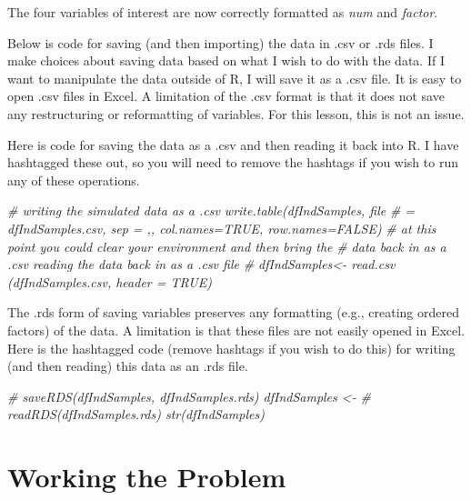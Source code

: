 \documentclass[
  11pt,
]{book}
\newenvironment{Shaded}{\begin{snugshade}}{\end{snugshade}}
\newcommand{\CommentTok}[1]{\textcolor[rgb]{0.56,0.35,0.01}{\textit{#1}}}
\begin{document}
The four variables of interest are now correctly formatted as \emph{num} and \emph{factor}.

Below is code for saving (and then importing) the data in .csv or .rds files. I make choices about saving data based on what I wish to do with the data. If I want to manipulate the data outside of R, I will save it as a .csv file. It is easy to open .csv files in Excel. A limitation of the .csv format is that it does not save any restructuring or reformatting of variables. For this lesson, this is not an issue.

Here is code for saving the data as a .csv and then reading it back into R. I have hashtagged these out, so you will need to remove the hashtags if you wish to run any of these operations.

\begin{Shaded}
\begin{Highlighting}[]
\CommentTok{\# writing the simulated data as a .csv write.table(dfIndSamples, file}
\CommentTok{\# = \textquotesingle{}dfIndSamples.csv\textquotesingle{}, sep = \textquotesingle{},\textquotesingle{}, col.names=TRUE, row.names=FALSE)}
\CommentTok{\# at this point you could clear your environment and then bring the}
\CommentTok{\# data back in as a .csv reading the data back in as a .csv file}
\CommentTok{\# dfIndSamples\textless{}{-} read.csv (\textquotesingle{}dfIndSamples.csv\textquotesingle{}, header = TRUE)}
\end{Highlighting}
\end{Shaded}

The .rds form of saving variables preserves any formatting (e.g., creating ordered factors) of the data. A limitation is that these files are not easily opened in Excel. Here is the hashtagged code (remove hashtags if you wish to do this) for writing (and then reading) this data as an .rds file.

\begin{Shaded}
\begin{Highlighting}[]
\CommentTok{\# saveRDS(dfIndSamples, \textquotesingle{}dfIndSamples.rds\textquotesingle{}) dfIndSamples \textless{}{-}}
\CommentTok{\# readRDS(\textquotesingle{}dfIndSamples.rds\textquotesingle{}) str(dfIndSamples)}
\end{Highlighting}
\end{Shaded}

\hypertarget{working-the-problem-1}{%
\section{Working the Problem}\label{working-the-problem-1}}
\end{document}
